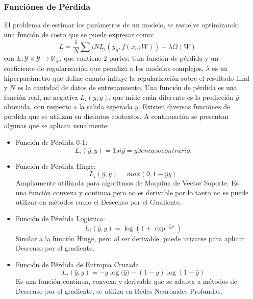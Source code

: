 \documentclass[a4paper,11pt,spanish]{book}
\begin{document}
	\subsubsection{Funciónes de Pérdida}
	  El problema de estimar los parámetros de un modelo, se resuelve optimizando una función de costo que se puede expresar como:
          \begin{equation}
	    L = \frac{1}{N}\sum{i}{N} L_i(y_n, f(x_n; W)) + \lambda \Omega(W)
          \end{equation}
          con $L:\mathcal{Y}\times \mathcal{Y}\rightarrow\mathbb{R}_+$, que contiene 2 partes: Una función de pérdida y un coeficiente de regularización que penaliza a los modelos complejos, 
          $\lambda$ es un hiperparámetro que define cuanto influye la regularización sobre el resultado final y $N$ es la cantidad de datos de entrenamiento.
	  Una función de pérdida es una función real, no negativa $L_i({\widehat y}, y)$, que mide cuán diferente es la predicción ${\widehat y}$ obtenida, con respecto a la
	  salida esperada $y$. Existen diversas funciónes de pérdida que se utilizan en distintos contextos. A continuación se presentan algunas que se aplican usualmente:
	  \begin{itemize}
	    \item Función de Pérdida 0-1:
	      \begin{equation}
		L_i({\widehat y}, y) =  1 si {\widehat y} = y 0 en caso contrario.
	      \end{equation}
	    \item Función de Pérdida Hinge:
	      \begin{equation}
		L_i({\widehat y}, y) =  max(0, 1 - {\widehat y}y)
	      \end{equation}
	      Ampliamente utilizada para algoritmos de Maquina de Vector Soporte.
	      Es una función convexa y continua pero no es derivable por lo tanto no se puede utilizar en métodos como el Descenso por el Gradiente.
	    \item Función de Pérdida Logistica:
	      \begin{equation}
		L_i({\widehat y}, y) =  {\log(1+ {\exp^{-{\widehat y}y}})}
	      \end{equation}
	      Similar a la función Hinge, pero al ser derivable, puede utizarse para aplicar Descenso por el gradiente.
	    \item Función de Pérdida de Entropia Cruzada
	      \begin{equation}
		L_i({\widehat y}, y) = -y{\log({\widehat y}}) - (1-y) {\log(1-{\widehat y})}
	      \end{equation}
	      Es una función continua, convexa y derivable que se adapta a métodos de Descenso por el gradiente, se utiliza en Redes Neuronales Profundas.

	  \end{itemize}
\end{document}
